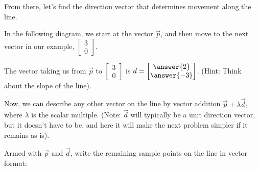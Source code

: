 \documentclass{ximera}
\begin{document}
\begin{exploration}
\begin{solution}
    From there, let's find the direction vector that determines movement along the line. 

    In the following diagram, we start at the vector $\vec{p}$, and then move to the next vector in our example, $\begin{bmatrix}
      3\\0
    \end{bmatrix}$. 

    \begin{center}
      \end{center}

      The vector taking us from $\vec{p}$ to $\begin{bmatrix}
        3\\0
      \end{bmatrix}$ is $d=\begin{bmatrix}
        \answer{2}\\\answer{-3}
      \end{bmatrix}$. (Hint: Think about the slope of the line).

      Now, we can describe any other vector on the line by vector addition $\vec{p}+\lambda \vec{d}$, where $\lambda$ is the scalar multiple. (Note: $\vec{d}$ will typically be a unit direction vector, but it doesn't have to be, and here it will make the next problem simpler if it remains as is).

    Armed with $\vec{p}$ and $\vec{d}$, write the remaining sample points on the line in vector format:


\end{solution}
\end{exploration}
\end{document}
